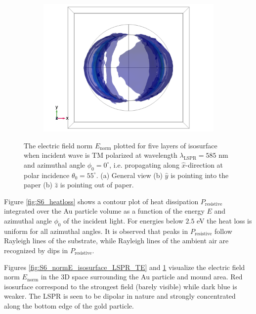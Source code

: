 \begin{figure}[h]
\begin{subfigure}{0.33\textwidth}
        \centering
        \includegraphics[width=\linewidth, trim=0.6cm 0 1.6cm 0, clip]{figures/ch4/S6/normE/Sample6_nomE_wl585_phi0_TM_ztowardsviewer.png}
        \caption{}
    \end{subfigure}
    \caption{The electric field norm $E_\text{norm}$ plotted for five layers of isosurface when incident wave is TM polarized at wavelength $\lambda_{\text{LSPR}}=585$ nm and azimuthal angle $\phi_0=0^\circ$, i.e. propagating along $\hat{x}$-direction at polar incidence $\theta_0=55^\circ$. (a) General view (b) $\hat{y}$ is pointing into the paper (b) $\hat{z}$ is pointing out of paper.}
    \label{fig:S6_normE_isosurface_LSPR_TM}
\end{figure}
Figure \ref{fig:S6_heatloss} shows a contour plot of heat dissipation $P_{\text{resistive}}$ integrated over the Au particle volume as a function of the energy $E$ and azimuthal angle $\phi_0$ of the incident light. For energies below $2.5$ eV the heat loss is uniform for all azimuthal angles. It is observed that peaks in $P_{\text{resistive}}$ follow Rayleigh lines of the substrate, while Rayleigh lines of the ambient air are recognized by dips in $P_{\text{resistive}}$.

Figures \ref{fig:S6_normE_isosurface_LSPR_TE} and \ref{fig:S6_normE_isosurface_LSPR_TM} visualize the electric field norm $E_\text{norm}$ in the 3D space surrounding the Au particle and mound area. Red isosurface correspond to the strongest field (barely visible) while dark blue is weaker. The LSPR is seen to be dipolar in nature and strongly concentrated along the bottom edge of the gold particle.

